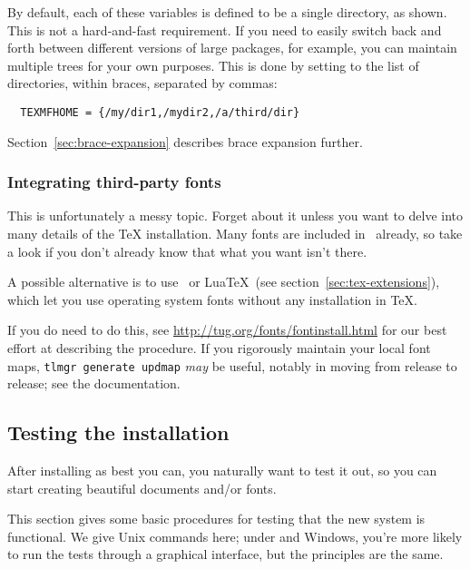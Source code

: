 \documentclass{article}
\begin{document}
By default, each of these variables is defined to be a single directory,
as shown.  This is not a hard-and-fast requirement.  If you need to
easily switch back and forth between different versions of large
packages, for example, you can maintain multiple trees for your own
purposes.  This is done by setting  to the
list of directories, within braces, separated by commas:

\begin{verbatim}
  TEXMFHOME = {/my/dir1,/mydir2,/a/third/dir}
\end{verbatim}

Section~\ref{sec:brace-expansion} describes brace expansion further.


\subsubsection{Integrating third-party fonts}

This is unfortunately a messy topic.  Forget about it unless you want to
delve into many details of the \TeX{} installation.  Many fonts are
included in \TL\ already, so take a look if you don't already know 
that what you want isn't there.

A possible alternative is to use \XeTeX\ or Lua\TeX\ (see
section~\ref{sec:tex-extensions}), which let you use operating system
fonts without any installation in \TeX.

If you do need to do this, see
\url{http://tug.org/fonts/fontinstall.html} for our best effort at
describing the procedure.  If you rigorously maintain your local font
maps, \texttt{tlmgr generate updmap} \textit{may} be useful, notably in
moving from release to release; see the  documentation.


\subsection{Testing the installation}
\label{sec:test-install}

After installing \TL{} as best you can, you naturally want to test
it out, so you can start creating beautiful documents and\slash or fonts.

This section gives some basic procedures for testing that the new system
is functional.  We give Unix commands here; under \MacOSX{} and Windows,
you're more likely to run the tests through a graphical interface, but
the principles are the same.
\end{document}
